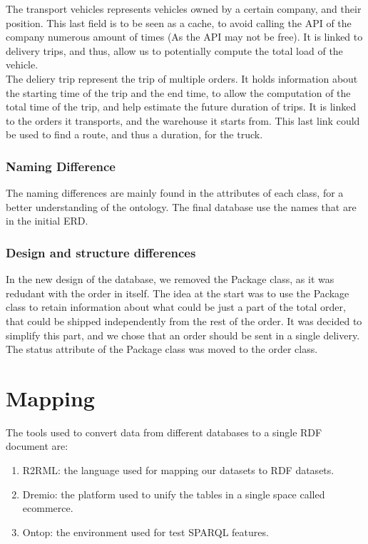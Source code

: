 \documentclass{article}
\begin{document}
The transport vehicles represents vehicles owned by a certain company, and their position. This last field is to be seen as a cache, to avoid calling the API of the company numerous amount of times (As the API may not be free). It is linked to delivery trips, and thus, allow us to potentially compute the total load of the vehicle. \\

The deliery trip represent the trip of multiple orders. It holds information about the starting time of the trip and the end time, to allow the computation of the total time of the trip, and help estimate the future duration of trips. It is linked to the orders it transports, and the warehouse it starts from. This last link could be used to find a route, and thus a duration, for the truck. \\

\subsubsection{Naming Difference}
The naming differences are mainly found in the attributes of each class, for a better understanding of the ontology. The final database use the names that are in the initial ERD.

\subsubsection{Design and structure differences}
In the new design of the database, we removed the Package class, as it was redudant with the order in itself. The idea at the start was to use the Package class to retain information about what could be just a part of the total order, that could be shipped independently from the rest of the order. It was decided to simplify this part, and we chose that an order should be sent in a single delivery. The status attribute of the Package class was moved to the order class.

\section{Mapping}
The tools used to convert data from different databases to a single RDF document are:
\begin{enumerate}
  \item R2RML: the language used for mapping our datasets to RDF datasets.
  \item Dremio: the platform used to unify the tables in a single space called ecommerce.
  \item Ontop: the environment used for test SPARQL features.
\end{enumerate}
\end{document}
